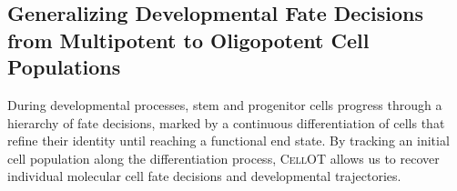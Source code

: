 \subsection{Generalizing Developmental Fate Decisions from Multipotent to Oligopotent Cell Populations}

 During developmental processes, stem and progenitor cells progress through a hierarchy of fate decisions, marked by a continuous differentiation of cells that refine their identity until reaching a functional end state.
By tracking an initial cell population along the differentiation process, \textsc{CellOT} allows us to recover individual molecular cell fate decisions and developmental trajectories. 


